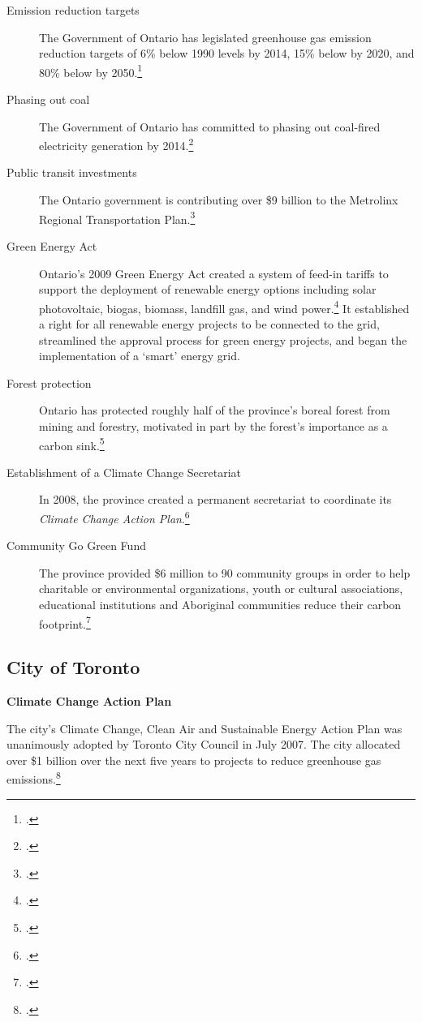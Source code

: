 \begin{description}
	\item[Emission reduction targets] The Government of Ontario has legislated greenhouse gas emission reduction targets of 6\% below 1990 levels by 2014, 15\% below by 2020, and 80\% below by 2050.\footcite[][]{OMEGreening}
	\item[Phasing out coal] The Government of Ontario has committed to phasing out coal-fired electricity generation by 2014.\footcite[][]{EPACessation}
	\item[Public transit investments] The Ontario government is contributing over \$9 billion to the Metrolinx Regional Transportation Plan.\footcite[][]{OMEGreening}
	\item[Green Energy Act] Ontario's 2009 Green Energy Act created a system of feed-in tariffs to support the deployment of renewable energy options including solar photovoltaic, biogas, biomass, landfill gas, and wind power.\footcite[][]{OMEGreen} 
It established a right for all renewable energy projects to be connected to the grid, streamlined the approval process for green energy projects, and began the implementation of a `smart' energy grid.
	\item[Forest protection] Ontario has protected roughly half of the province's boreal forest from mining and forestry, motivated in part by the forest's importance as a carbon sink.\footcite[][]{RobbingCarbonBank}
	\item[Establishment of a Climate Change Secretariat] In 2008, the province created a permanent secretariat to coordinate its \emph{Climate Change Action Plan}.\footcite[][]{OMEGreening}
	\item[Community Go Green Fund] The province provided \$6 million to 90 community groups in order to help charitable or environmental organizations, youth or cultural associations, educational institutions and Aboriginal communities reduce their carbon footprint.\footcite[][]{OMEGreening}
\end{description}	



	\subsection{City of Toronto}



\textbf{Climate Change Action Plan}

The city's Climate Change, Clean Air and Sustainable Energy Action Plan was unanimously adopted by Toronto City Council in July 2007. The city allocated over \$1 billion over the next five years to projects to reduce greenhouse gas emissions.\footcite{TorontoEnvOff2007}


